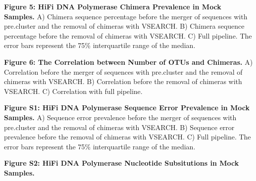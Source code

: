 \documentclass[12pt,]{article}
\begin{document}
\textbf{Figure 5: HiFi DNA Polymerase Chimera Prevalence in Mock
Samples.} A) Chimera sequence percentage before the merger of sequences
with pre.cluster and the removal of chimeras with VSEARCH. B) Chimera
sequence percentage before the removal of chimeras with VSEARCH. C) Full
pipeline. The error bars represent the 75\% interquartile range of the
median.

\textbf{Figure 6: The Correlation between Number of OTUs and Chimeras.}
A) Correlation before the merger of sequences with pre.cluster and the
removal of chimeras with VSEARCH. B) Correlation before the removal of
chimeras with VSEARCH. C) Correlation with full pipeline.

\newpage

\textbf{Figure S1: HiFi DNA Polymerase Sequence Error Prevalence in Mock
Samples.} A) Sequence error prevalence before the merger of sequences
with pre.cluster and the removal of chimeras with VSEARCH. B) Sequence
error prevalence before the removal of chimeras with VSEARCH. C) Full
pipeline. The error bars represent the 75\% interquartile range of the
median.

\textbf{Figure S2: HiFi DNA Polymerase Nucleotide Subsitutions in Mock
Samples.}
\end{document}
